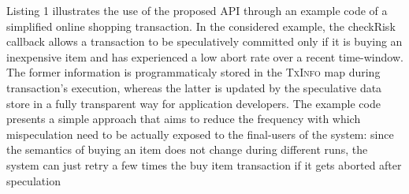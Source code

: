 Listing 1 illustrates the use of the proposed API through an example code of a simplified online shopping transaction. In the considered example, the checkRisk callback allows a transaction to be speculatively committed only if it is buying an inexpensive item and has experienced a low abort rate over a recent time-window. The former information is programmaticaly stored  in the \textsc{TxInfo} map during transaction's execution, whereas the latter is updated by the speculative data store in a fully transparent way for application developers. The example code presents a simple approach that aims to reduce the frequency with which mispeculation need to be actually exposed to the final-users of the system: since the semantics of buying an item does not change during different runs, the system can just retry a few times the buy item transaction if it gets aborted after speculation


